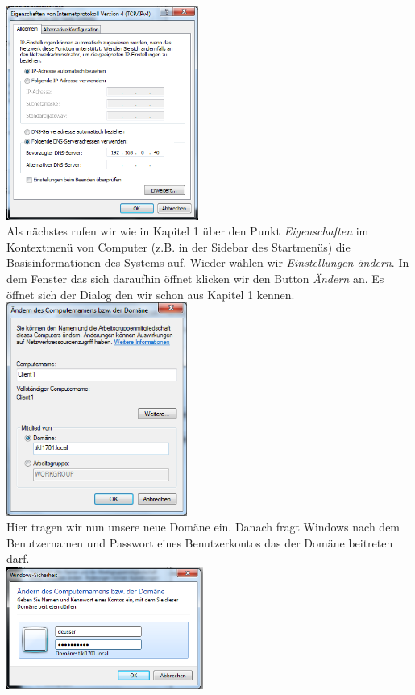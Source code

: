 \documentclass[12pt,a4paper,titlepage]{scrartcl} %
\begin{document}
	\includegraphics[height=7cm]{Bilder/Client/Client01}\\
	
Als nächstes rufen wir wie in Kapitel 1 über den Punkt \emph{Eigenschaften} im Kontextmenü von Computer (z.B. in der Sidebar des Startmenüs) die Basisinformationen des Systems auf. Wieder wählen wir \emph{Einstellungen ändern}. In dem Fenster das sich daraufhin öffnet klicken wir den Button \emph{Ändern} an. Es öffnet sich der Dialog den wir schon aus Kapitel 1 kennen.\\

	\includegraphics[height=7cm]{Bilder/Client/Client03}\\
	
Hier tragen wir nun unsere neue Domäne ein. Danach fragt Windows nach dem Benutzernamen und Passwort eines Benutzerkontos das der Domäne beitreten darf.\\

	\includegraphics[height=4cm]{Bilder/Client/Client04}\\
\end{document}
